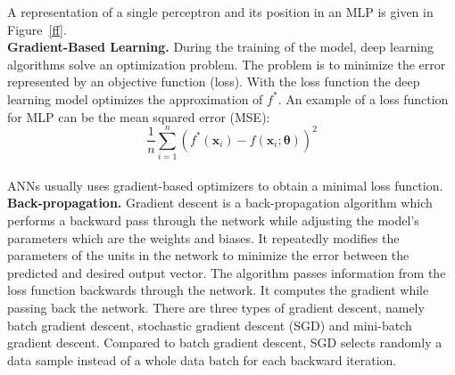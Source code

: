 A representation of a single perceptron and its position in an MLP is given in
Figure~\ref{ff}.\\



\textbf{Gradient-Based Learning.} During the training of the model, deep
learning algorithms solve an optimization problem. The problem is to minimize
the error represented by an objective function (loss).  With the loss function
the deep learning model optimizes the approximation of $f^{*}$. An example of a
loss function for MLP can be the mean squared error (MSE):\\

\begin{equation} 
  \frac{1}{n}\sum_{i=1}^n(f^*(\bm x_i)-f(\bm x_i;\bm{\theta}))^2
\end{equation}~\\

ANNs usually uses gradient-based optimizers to obtain a minimal loss function.\\


\textbf{Back-propagation.} Gradient descent is a back-propagation algorithm
which performs a backward pass through the network while adjusting the model's
parameters which are the weights and biases. It repeatedly modifies the
parameters of the units in the network to minimize the error between the
predicted and desired output vector. The algorithm passes information from the
loss function backwards through the network. It computes the gradient while
passing back the network. There are three types of gradient descent, namely
batch gradient descent, stochastic gradient descent (SGD) and mini-batch
gradient descent. Compared to batch gradient descent, SGD selects randomly a
data sample instead of a whole data batch for each backward iteration.
